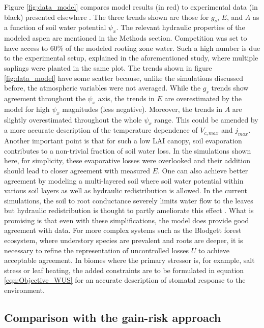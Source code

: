 \documentclass[utf8]{frontiersSCNS} %
\begin{document}
Figure \ref{fig:data_model} compares model results (in red) to experimental data (in black) presented elsewhere \citep{venturas_2018}. The three trends shown are those for $g_s$, $E$, and $A$ as a function of soil water potential $\psi_x$. The relevant hydraulic properties of the modeled aspen are mentioned in the Methods section. Competition was set to have access to $60\%$ of the modeled rooting zone water. Such a high number is due to the experimental setup, explained in the aforementioned study, where multiple saplings were planted in the same plot. The trends shown in figure \ref{fig:data_model} have some scatter because, unlike the simulations discussed before, the atmospheric variables were not averaged. While the $g_s$ trends show agreement throughout the $\psi_x$ axis, the trends in $E$ are overestimated by the model for high $\psi_x$ magnitudes (less negative). Moreover, the trends in $A$ are slightly overestimated throughout the whole $\psi_x$ range. This could be amended by a more accurate description of the temperature dependence of $V_{c,max}$ and $j_{max}$. Another important point is that for such a low LAI canopy, soil evaporation contributes to a non-trivial fraction of soil water loss. In the simulations shown here, for simplicity, these evaporative losses were overlooked and their addition should lead to closer agreement with measured $E$. One can also achieve better agreement by modeling a multi-layered soil where soil water potential within various soil layers as well as hydraulic redistribution is allowed. In the current simulations, the soil to root conductance severely limits water flow to the leaves but hydraulic redistribution is thought to partly ameliorate this effect \citep{huang_2017}. What is promising is that even with these simplifications, the model does provide good agreement with data. For more complex systems such as the Blodgett forest ecosystem, where understory species are prevalent and roots are deeper, it is necessary to refine the representation of uncontrolled losses $U$ to achieve acceptable agreement. In biomes where the primary stressor is, for example, salt stress or leaf heating, the added constraints are to be formulated in equation \ref{eqn:Objective_WUS} for an accurate description of stomatal response to the environment. 

\subsection{Comparison with the gain-risk approach}
\end{document}
